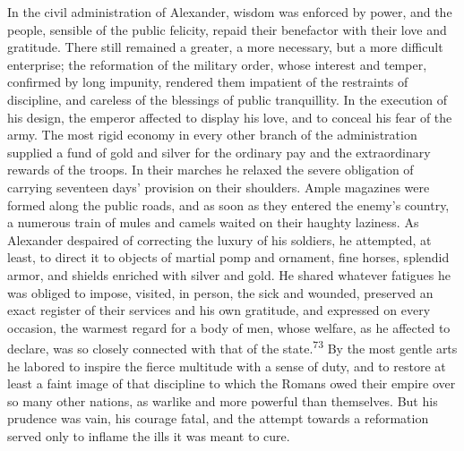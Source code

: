 In the civil administration of Alexander, wisdom was enforced by
power, and the people, sensible of the public felicity, repaid
their benefactor with their love and gratitude. There still
remained a greater, a more necessary, but a more difficult
enterprise; the reformation of the military order, whose interest
and temper, confirmed by long impunity, rendered them impatient
of the restraints of discipline, and careless of the blessings of
public tranquillity. In the execution of his design, the emperor
affected to display his love, and to conceal his fear of the
army. The most rigid economy in every other branch of the
administration supplied a fund of gold and silver for the
ordinary pay and the extraordinary rewards of the troops. In
their marches he relaxed the severe obligation of carrying
seventeen days’ provision on their shoulders. Ample magazines
were formed along the public roads, and as soon as they entered
the enemy’s country, a numerous train of mules and camels waited
on their haughty laziness. As Alexander despaired of correcting
the luxury of his soldiers, he attempted, at least, to direct it
to objects of martial pomp and ornament, fine horses, splendid
armor, and shields enriched with silver and gold. He shared
whatever fatigues he was obliged to impose, visited, in person,
the sick and wounded, preserved an exact register of their
services and his own gratitude, and expressed on every occasion,
the warmest regard for a body of men, whose welfare, as he
affected to declare, was so closely connected with that of the
state.\textsuperscript{73} By the most gentle arts he labored to inspire the
fierce multitude with a sense of duty, and to restore at least a
faint image of that discipline to which the Romans owed their
empire over so many other nations, as warlike and more powerful
than themselves. But his prudence was vain, his courage fatal,
and the attempt towards a reformation served only to inflame the
ills it was meant to cure.


